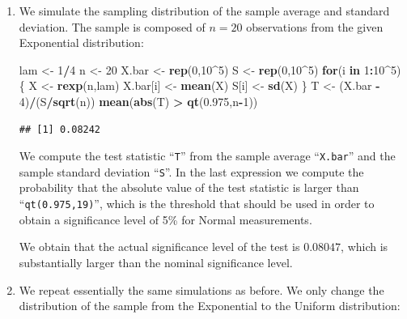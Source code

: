 \documentclass[]{krantz}
\makeatletter
\newenvironment{Shaded}{\begin{snugshade}}{\end{snugshade}}
\newcommand{\KeywordTok}[1]{\textcolor[rgb]{0.13,0.29,0.53}{\textbf{#1}}}
\newcommand{\DecValTok}[1]{\textcolor[rgb]{0.00,0.00,0.81}{#1}}
\newcommand{\FloatTok}[1]{\textcolor[rgb]{0.00,0.00,0.81}{#1}}
\newcommand{\StringTok}[1]{\textcolor[rgb]{0.31,0.60,0.02}{#1}}
\newcommand{\ControlFlowTok}[1]{\textcolor[rgb]{0.13,0.29,0.53}{\textbf{#1}}}
\newcommand{\OperatorTok}[1]{\textcolor[rgb]{0.81,0.36,0.00}{\textbf{#1}}}
\newcommand{\NormalTok}[1]{#1}
\newenvironment{kframe}{%
\medskip{}
\setlength{\fboxsep}{.8em}
 \def\at@end@of@kframe{}%
 \ifinner\ifhmode%
  \def\at@end@of@kframe{\end{minipage}}%
  \begin{minipage}{\columnwidth}%
 \fi\fi%
 \def\FrameCommand##1{\hskip\@totalleftmargin \hskip-\fboxsep
 \colorbox{shadecolor}{##1}\hskip-\fboxsep
     \hskip-\linewidth \hskip-\@totalleftmargin \hskip\columnwidth}%
 \MakeFramed {\advance\hsize-\width
   \@totalleftmargin\z@ \linewidth\hsize
   \@setminipage}}%
 {\par\unskip\endMakeFramed%
 \at@end@of@kframe}
\renewenvironment{Shaded}{\begin{kframe}}{\end{kframe}}
\theoremstyle{definition}
\theoremstyle{definition}
\theoremstyle{definition}
\theoremstyle{remark}
\makeatother
\begin{document}
\begin{enumerate}
\def\labelenumi{\arabic{enumi}.}
\item
  We simulate the sampling distribution of the sample average and
  standard deviation. The sample is composed of \(n=20\) observations
  from the given Exponential distribution:

\begin{Shaded}
\begin{Highlighting}[]
\NormalTok{lam <-}\StringTok{ }\DecValTok{1}\OperatorTok{/}\DecValTok{4}
\NormalTok{n <-}\StringTok{ }\DecValTok{20}
\NormalTok{X.bar <-}\StringTok{ }\KeywordTok{rep}\NormalTok{(}\DecValTok{0}\NormalTok{,}\DecValTok{10}\OperatorTok{^}\DecValTok{5}\NormalTok{)}
\NormalTok{S <-}\StringTok{ }\KeywordTok{rep}\NormalTok{(}\DecValTok{0}\NormalTok{,}\DecValTok{10}\OperatorTok{^}\DecValTok{5}\NormalTok{)}
\ControlFlowTok{for}\NormalTok{(i }\ControlFlowTok{in} \DecValTok{1}\OperatorTok{:}\DecValTok{10}\OperatorTok{^}\DecValTok{5}\NormalTok{) \{}
\NormalTok{  X <-}\StringTok{ }\KeywordTok{rexp}\NormalTok{(n,lam)}
\NormalTok{  X.bar[i] <-}\StringTok{ }\KeywordTok{mean}\NormalTok{(X)}
\NormalTok{  S[i] <-}\StringTok{ }\KeywordTok{sd}\NormalTok{(X)}
\NormalTok{\}}
\NormalTok{T <-}\StringTok{ }\NormalTok{(X.bar }\OperatorTok{-}\StringTok{ }\DecValTok{4}\NormalTok{)}\OperatorTok{/}\NormalTok{(S}\OperatorTok{/}\KeywordTok{sqrt}\NormalTok{(n))}
\KeywordTok{mean}\NormalTok{(}\KeywordTok{abs}\NormalTok{(T) }\OperatorTok{>}\StringTok{ }\KeywordTok{qt}\NormalTok{(}\FloatTok{0.975}\NormalTok{,n}\OperatorTok{-}\DecValTok{1}\NormalTok{))}
\end{Highlighting}
\end{Shaded}

\begin{verbatim}
## [1] 0.08242
\end{verbatim}

  We compute the test statistic ``\texttt{T}'' from the sample average
  ``\texttt{X.bar}'' and the sample standard deviation ``\texttt{S}''.
  In the last expression we compute the probability that the absolute
  value of the test statistic is larger than ``\texttt{qt(0.975,19)}'',
  which is the threshold that should be used in order to obtain a
  significance level of 5\% for Normal measurements.

  We obtain that the actual significance level of the test is
  \(0.08047\), which is substantially larger than the nominal
  significance level.
\item
  We repeat essentially the same simulations as before. We only change
  the distribution of the sample from the Exponential to the Uniform
  distribution:


\end{enumerate}
\end{document}
